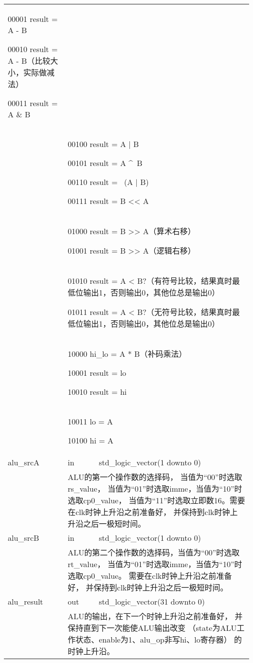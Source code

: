 \begin{tabularx}{\textwidth}{lll}
{            00001 result = A - B

            00010 result = A - B（比较大小，实际做减法）

            00011 result = A \& B
            } \\
            &
            \multicolumn{2}{X}{
            00100 result = A | B

            00101 result = A \textasciicircum \ B

            00110 result = ~(A | B)

            00111 result = B << A
            } \\
            &
            \multicolumn{2}{X}{
            01000 result = B >> A（算术右移）

            01001 result = B >> A（逻辑右移）
            } \\
            &
            \multicolumn{2}{X}{
            01010 result = A < B?（有符号比较，结果真时最低位输出1，否则输出0，其他位总是输出0）

            01011 result = A < B?（无符号比较，结果真时最低位输出1，否则输出0，其他位总是输出0）
            } \\
            &
            \multicolumn{2}{X}{
            10000 hi\_lo = A * B（补码乘法）

            10001 result = lo

            10010 result = hi
            } \\
            &
            \multicolumn{2}{X}{
            10011 lo = A

            10100 hi = A} \\
            \midrule
            alu\_srcA & in & std\_logic\_vector(1 downto 0) \\
            \cmidrule(l){2-3}
            &
            \multicolumn{2}{X}{
            ALU的第一个操作数的选择码，%
            当值为“00”时选取rs\_value，%
            当值为“01”时选取imme，当值为“10”时选取cp0\_value，%
            当值为“11”时选取立即数16。需要在clk时钟上升沿之前准备好，%
            并保持到clk时钟上升沿之后一极短时间。
            } \\
            \midrule
            alu\_srcB & in & std\_logic\_vector(1 downto 0) \\
            \cmidrule(l){2-3}
            &
            \multicolumn{2}{X}{
            ALU的第二个操作数的选择码，当值为“00”时选取rt\_value，%
            当值为“01”时选取imme，当值为“10”时选取cp0\_value。%
            需要在clk时钟上升沿之前准备好，%
            并保持到clk时钟上升沿之后一极短时间。
            } \\
            \midrule
            alu\_result & out & std\_logic\_vector(31 downto 0) \\
            \cmidrule(l){2-3}
            &
            \multicolumn{2}{X}{
            ALU的输出，在下一个时钟上升沿之前准备好，%
            并保持直到下一次能使ALU输出改变%
            （state为ALU工作状态、enable为1、alu\_op非写hi、lo寄存器）%
            的时钟上升沿。
            } \\
            \bottomrule
            \end{tabularx}
